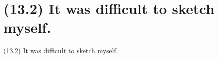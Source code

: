 \documentclass{article}
\begin{document}
\clearpage

%
%

\section*{(13.2) It was difficult to sketch myself.}

\bigbreak
\begin{enumerate*}
\item[(13.2)] It was difficult to sketch myself.
\end{enumerate*}
\bigbreak
\end{document}
